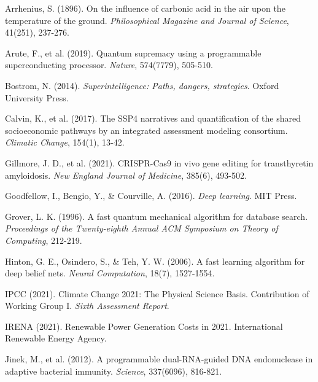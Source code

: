 \documentclass[12pt,a4paper,twoside,openright,openany]{book}
\begin{document}
	
	\begin{thebibliography}{99}
		
		Arrhenius, S. (1896). On the influence of carbonic acid in the air upon the temperature of the ground.
		\textit{Philosophical Magazine and Journal of Science}, 41(251), 237-276.
		
		Arute, F., et al. (2019). Quantum supremacy using a programmable superconducting processor.
		\textit{Nature}, 574(7779), 505-510.
		
		Bostrom, N. (2014). \textit{Superintelligence: Paths, dangers, strategies}.
		Oxford University Press.
		
		Calvin, K., et al. (2017). The SSP4 narratives and quantification of the shared socioeconomic pathways by an integrated assessment modeling consortium.
		\textit{Climatic Change}, 154(1), 13-42.
		
		Gillmore, J. D., et al. (2021). CRISPR-Cas9 in vivo gene editing for transthyretin amyloidosis.
		\textit{New England Journal of Medicine}, 385(6), 493-502.
		
		Goodfellow, I., Bengio, Y., \& Courville, A. (2016). \textit{Deep learning}.
		MIT Press.
		
		Grover, L. K. (1996). A fast quantum mechanical algorithm for database search.
		\textit{Proceedings of the Twenty-eighth Annual ACM Symposium on Theory of Computing}, 212-219.
		
		Hinton, G. E., Osindero, S., \& Teh, Y. W. (2006). A fast learning algorithm for deep belief nets.
		\textit{Neural Computation}, 18(7), 1527-1554.
		
		IPCC (2021). Climate Change 2021: The Physical Science Basis. Contribution of Working Group I.
		\textit{Sixth Assessment Report}.
		
		IRENA (2021). Renewable Power Generation Costs in 2021.
		International Renewable Energy Agency.
		
		Jinek, M., et al. (2012). A programmable dual-RNA-guided DNA endonuclease in adaptive bacterial immunity.
		\textit{Science}, 337(6096), 816-821.
		

\end{thebibliography}
\end{document}
